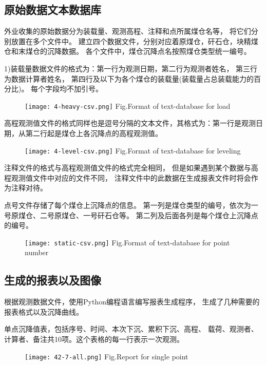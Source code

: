 \subsection{原始数据文本数据库}
外业收集的原始数据分为装载量、观测高程、注释和点所属煤仓名等，
将它们分别放置在多个文件中。
建立四个数据文件，分别对应着原煤仓，矸石仓，块精煤仓和末煤仓的沉降数据。
各个文件中，煤仓沉降点名按照煤仓类型统一编号。

1)装载量数据文件的格式为：第一行为观测日期，第二行为观测者姓名，
第三行为数据计算者姓名，
第四行及以下为各个煤仓的装载量(装载量占总装载能力的百分比)。
每个字段均不加引号。
\begin{figure}[!h]
   \centering
   \texttt{[image: 4-heavy-csv.png]}
			{Fig.}{Format of text-database for load}
\end{figure}

高程观测值文件的格式同样也是逗号分隔的文本文件，其格式为：第一行是观测日期，从第二行起是煤仓上各沉降点的高程观测值。
\begin{figure}[!h]
   \centering
   \texttt{[image: 4-level-csv.png]}
			{Fig.}{Format of text-database for leveling}
\end{figure}

注释文件的格式与高程观测值文件的格式完全相同，
但是如果遇到某个数据与高程观测值文件中对应的文件不同，
注释文件中的此数据在生成报表文件时将会作为注释对待。

\newpage
点号文件存储了每个煤仓上沉降点的信息。
第一列是煤仓类型的编号，依次为一号原煤仓、二号原煤仓、一号矸石仓等。
第二列及后面各列是每个煤仓上沉降点的编号。
\begin{figure}[!h]
   \centering
   \texttt{[image: static-csv.png]}
			{Fig.}{Format of text-database for point number}
\end{figure}

\subsection{生成的报表以及图像}
根据观测数据文件，使用Python编程语言编写报表生成程序，
生成了几种需要的报表格式以及沉降曲线。

单点沉降值表，包括序号、时间、本次下沉、累积下沉、高程、
载荷、观测者、计算者、备注共10项。这个表格的每一行表示一次观测。
\begin{figure}[!h]
   \centering
   \texttt{[image: 42-7-all.png]}
			{Fig.}{Report for single point}
\end{figure}

